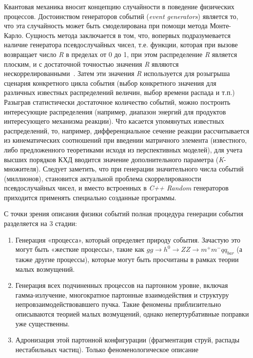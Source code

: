 Квантовая механика вносит концепцию случайности в
поведение физических процессов. Достоинством
генераторов событий (\textit{event generators}) является то, что эта
случайность может быть смоделирована при помощи метода
Монте-Карло. Сущность метода заключается в том, что, вопервых подразумевается наличие генератора
псевдослучайных чисел, т.е. функции, которая при вызове
возвращает число \textit{R} в пределах от 0 до 1, при этом
распределение \textit{R} является плоским, и с достаточной
точностью значения \textit{R} являются нескоррелированными~\cite{review-pythia}.
Затем эти значения \textit{R} используется для розыгрыша сценария
конкретного цикла события (выбор конкретного значения
для различных известных распределений величин, выбор
времени распада и т.п.) Разыграв статистически достаточное
количество событий, можно построить интересующие распределения (например, диапазон энергий для
продуктов интересующего механизма реакции).
Что касается упомянутых известных распределений,
то, например, дифференциальное сечение реакции
рассчитывается из кинематических соотношений при
введении матричного элемента (известного, либо
предложенного теоретиками исходя из перспективных
моделей), для учета высших порядков КХД вводится
значение дополнительного параметра (\textit{K}-множителя).
Следует заметить, что при генерации значительного
числа событий (миллионов), становится актуальной
проблема скоррелированости псевдослучайных чисел, и
вместо встроенных в \textit{C++ Random} генераторов приходится
применять специально созданные программы.


С точки зрения описания физики событий полная
процедура генерации события разделяется на 3 стадии:

\begin{enumerate}
	\item Генерация «процесса», который определяет природу
	события. Зачастую это могут быть «жесткие процессы»,
	такие как $gg \rightarrow {h}^{0} \rightarrow ZZ \rightarrow {m}^{+}{m}^{-}{qq}_{bar}$ (а также другие
	процессы), которые могут быть просчитаны в рамках
	теории малых возмущений.

	\item Генерация всех подчиненных процессов на партонном
	уровне, включая гамма-излучение, многократное партонные
	взаимодействия и структуру непровзаимодействовавшего
	пучка. Такие феномены приблизительно описываются
	теорией малых возмущений, однако непертурбативные
	поправки уже существенны.
	\item Адронизация этой партонной конфигурации
	(фрагментация струй, распады нестабильных частиц).
	Только феноменологическое описание
\end{enumerate}

